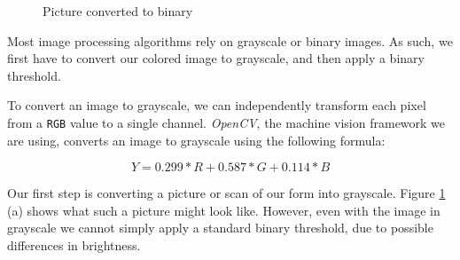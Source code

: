 \documentclass[11pt, a4paper]{report}
\def\code#1{\texttt{#1}}
\begin{document}
\begin{figure}[!h]
\hfill
{}
{}
\hfill
\caption{Picture converted to binary}
\label{original-vs-processed-image}
\end{figure}

Most image processing algorithms rely on grayscale or binary images. As such, we first have to convert our colored image to grayscale, and then apply a binary threshold.

To convert an image to grayscale, we can independently transform each pixel from a \code{RGB} value to a single channel. \textit{OpenCV}, the machine vision framework we are using, converts an image to grayscale using the following formula\cite{opencv-color-convention}:

$$Y = 0.299*R+0.587*G+0.114*B$$

Our first step is converting a picture or scan of our form into grayscale. Figure \ref{original-vs-processed-image} (a) shows what such a picture might look like. However, even with the image in grayscale we cannot simply apply a standard binary threshold, due to possible differences in brightness.
\end{document}
